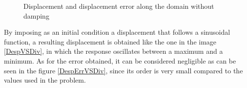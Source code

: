 \documentclass[a4paper, 10pt]{article}
\begin{document}

\begin{figure}
 \centering
  \caption{Displacement and displacement error along the domain without damping}
 \label{DespVSDiv2}
\end{figure}



By imposing as an initial condition a displacement that follows a sinusoidal function, a resulting displacement is obtained like the one in the image \ref{DespVSDiv}, in which the response oscillates between a maximum and a minimum. As for the error obtained, it can be considered negligible as can be seen in the figure \ref{DespErrVSDiv}, since its order is very small compared to the values used in the problem.\\

\end{document}
